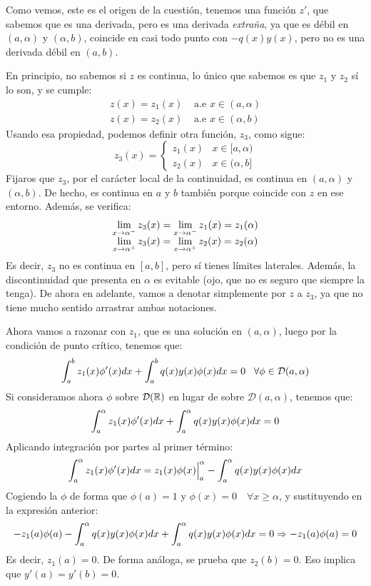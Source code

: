 Como vemos, este es el origen de la cuestión, tenemos una función $z'$, que sabemos que es una derivada, pero es una derivada \textit{extraña}, ya que es débil en $(a,\alpha)$ y $(\alpha,b)$, coincide en casi todo punto con $-q(x)y(x)$, pero no es una derivada débil en $(a,b)$. 

En principio, no sabemos si $z$ es continua, lo único que sabemos es que $z_1$ y $z_2$ sí lo son, y se cumple:
\[
\begin{array}{cc}
z(x)=z_1(x) & \text{ a.e } x\in(a,\alpha) \\
z(x)=z_2(x) & \text{ a.e } x\in(\alpha,b)
\end{array}
\]
Usando esa propiedad, podemos definir otra función, $z_3$, como sigue:
\[
z_3(x)=\left\{
\begin{array}{cc}
z_1(x) & x\in[a,\alpha) \\
z_2(x) & x\in(\alpha,b]
\end{array}
\right.
\]
Fijaros que $z_3$, por el carácter local de la continuidad, es continua en $(a,\alpha)$ y $(\alpha,b)$. De hecho, es continua en $a$ y $b$ también porque coincide con $z$ en ese entorno. Además, se verifica:
\[
\begin{array}{c}
\displaystyle\lim_{ x \to \alpha^- } z_3(x)=\displaystyle\lim_{ x \to \alpha^- } z_1(x)=z_1(\alpha)\\
\displaystyle\lim_{ x \to \alpha^+ } z_3(x)=\displaystyle\lim_{ x \to \alpha^+ } z_2(x)=z_2(\alpha)
\end{array}
\]
Es decir, $z_3$ no es continua en $[a,b]$, pero sí tienes límites laterales. Además, la discontinuidad que presenta en $\alpha$ es evitable (ojo, que no es seguro que siempre la tenga). De ahora en adelante, vamos a denotar simplemente por $z$ a $z_3$, ya que no tiene mucho sentido arrastrar ambas notaciones. 

Ahora vamos a razonar con $z_1$, que es una solución en $(a,\alpha)$, luego por la condición de punto crítico, tenemos que:
\[
\displaystyle\int_{ a }^{ b } z_1(x)\phi'(x)dx+\displaystyle\int_{ a }^{ b } q(x)y(x)\phi(x)dx=0 \;\;\; \forall\phi\in\mathcal{D}(a,\alpha)
\]
Si consideramos ahora $\phi$ sobre $\mathcal{D}(\mathbb{R})$ en lugar de sobre $\mathcal{D}(a,\alpha)$, tenemos que:
\[
\displaystyle\int_{ a }^{ \alpha } z_1(x)\phi'(x)dx+\displaystyle\int_{ a }^{ \alpha } q(x)y(x)\phi(x)dx=0
\] 
Aplicando integración por partes al primer término:
\[
\displaystyle\int_{ a }^{ \alpha } z_1(x)\phi'(x)dx=z_1(x)\phi(x)\Big|_a^\alpha-\displaystyle\int_{ a }^{ \alpha } q(x)y(x)\phi(x)dx
\]
Cogiendo la $\phi$ de forma que $\phi(a)=1$ y $\phi(x)=0\quad\forall x\geq\alpha$, y sustituyendo en la expresión anterior:
\[
-z_1(a)\phi(a)-\displaystyle\int_{ a }^{ \alpha } q(x)y(x)\phi(x)dx+\displaystyle\int_{ a }^{ \alpha } q(x)y(x)\phi(x)dx=0 \Rightarrow -z_1(a)\phi(a)=0
\]
Es decir, $z_1(a)=0$. De forma análoga, se prueba que $z_2(b)=0$. Eso implica que $y'(a)=y'(b)=0$.
